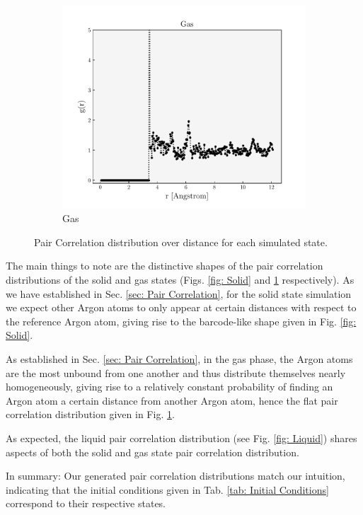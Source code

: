 \documentclass{IAYCPro}
\begin{document}
\begin{figure}[H]
\begin{subfigure}{0.49\textwidth}  
    \includegraphics[width = 1\textwidth]{figs/gas.pdf}
    \caption{Gas}
    \label{fig: Gas}
\end{subfigure}
\caption{Pair Correlation distribution over distance for each simulated state.}
\label{fig: Pair Correlation}
\end{figure}

The main things to note are the distinctive shapes of the pair correlation distributions of the solid and gas states (Figs. \ref{fig: Solid} and \ref{fig: Gas} respectively). As we have established in Sec. \ref{sec: Pair Correlation}, for the solid state simulation we expect other Argon atoms to only appear at certain distances with respect to the reference Argon atom, giving rise to the barcode-like shape given in Fig. \ref{fig: Solid}. 

As established in Sec. \ref{sec: Pair Correlation}, in the gas phase, the Argon atoms are the most unbound from one another and thus distribute themselves nearly homogeneously, giving rise to a relatively constant probability of finding an Argon atom a certain distance from another Argon atom, hence the flat pair correlation distribution given in Fig. \ref{fig: Gas}. 

As expected, the liquid pair correlation distribution (see Fig. \ref{fig: Liquid}) shares aspects of both the solid and gas state pair correlation distribution.

In summary: Our generated pair correlation distributions match our intuition, indicating that the initial conditions given in Tab. \ref{tab: Initial Conditions} correspond to their respective states.
\end{document}
